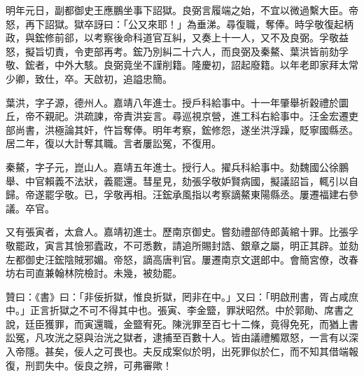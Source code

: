 \begin{pinyinscope}
明年元日，副都御史王應鵬坐事下詔獄。良弼言履端之始，不宜以微過繫大臣。帝怒，再下詔獄。獄卒訝曰：「公又來耶！」為垂涕。尋復職，奪俸。時孚敬復起柄政，與鋐修前郤，以考察後命科道官互糾，又奏上十一人，又不及良弼。孚敬益怒，擬旨切責，令吏部再考。鋐乃別糾二十六人，而良弼及秦鰲、葉洪皆前劾孚敬、鋐者，中外大駭。良弼竟坐不謹削籍。隆慶初，詔起廢籍。以年老即家拜太常少卿，致仕，卒。天啟初，追謚忠簡。

葉洪，字子源，德州人。嘉靖八年進士。授戶科給事中。十一年肇舉祈穀禮於圜丘，帝不親祀。洪疏諫，帝責洪妄言。尋巡視京營，進工科右給事中。汪金宏遷吏部尚書，洪極論其奸，忤旨奪俸。明年考察，鋐修怨，遂坐洪浮躁，貶寧國縣丞。居二年，復以大計奪其職。言者屢訟冤，不復用。

秦鰲，字子元，崑山人。嘉靖五年進士。授行人。擢兵科給事中。劾魏國公徐鵬舉、中官賴義不法狀，義罷還。彗星見，劾張孚敬妒賢病國，擬議詔旨，輒引以自歸。帝遂罷孚敬。已，孚敬再相。汪鋐承風指以考察謫鰲東陽縣丞。屢遷福建右參議。卒官。

又有張寅者，太倉人。嘉靖初進士。歷南京御史。嘗劾禮部侍郎黃綰十罪。比張孚敬罷政，寅言其憸邪蠹政，不可悉數，請追所賜封誥、銀章之屬，明正其辟。並劾左都御史汪鋐陰賊邪媚。帝怒，謫高唐判官。屢遷南京文選郎中。會簡宮僚，改春坊右司直兼翰林院檢討。未幾，被劾罷。

贊曰：《書》曰：「非佞折獄，惟良折獄，罔非在中。」又曰：「明啟刑書，胥占咸庶中。」正言折獄之不可不得其中也。張寅、李金盬，罪狀昭然。中於郭勛、席書之說，廷臣獲罪，而寅還職，金盬宥死。陳洸罪至百七十二條，竟得免死，而猶上書訟冤，凡攻洸之惡與治洸之獄者，逮捕至百數十人。皆由議禮觸眾怒，一言有以深入帝隱。甚矣，佞人之可畏也。夫反成案似於明，出死罪似於仁，而不知其借端報復，刑罰失中。佞良之辨，可弗審歟！


\end{pinyinscope}